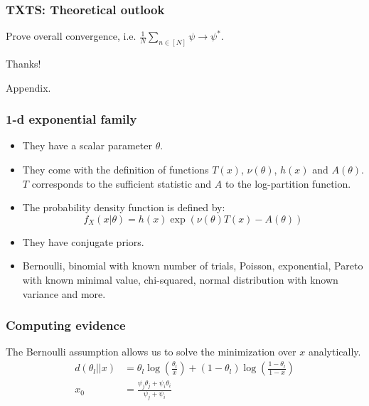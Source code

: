\documentclass[aspectratio=43]{beamer}
\begin{document}
\begin{frame}
\frametitle{TXTS: Theoretical outlook}
Prove overall convergence, i.e. $\frac{1}{N}\sum_{n \in [N]} \psi \rightarrow \psi^*$.
\end{frame}

\begin{frame}
Thanks!
\end{frame}

\appendix

\begin{frame}
Appendix.
\end{frame}

\begin{frame}
\frametitle{1-d exponential family}
\begin{itemize}
  \item They have a scalar parameter $\theta$.
  \item They come with the definition of functions $T(x)$, $\nu(\theta)$, $h(x)$ and $A(\theta)$. $T$ corresponds to the sufficient statistic and $A$ to the log-partition function.
  \item The probability density function is defined by:
    \[f_X(x|\theta) = h(x) \exp(\nu(\theta) T(x) - A(\theta))\]
  \item They have conjugate priors.
  \item Bernoulli, binomial with known number of trials, Poisson,
      exponential, Pareto with known minimal value, chi-squared, normal
      distribution with known variance and more.
\end{itemize}
\end{frame}

\begin{frame}
\frametitle{Computing evidence}
The Bernoulli assumption allows us to solve the minimization over $x$ analytically.
\begin{align}
  d(\theta_l||x) &= \theta_l \log(\frac{\theta_l}{x}) + (1-\theta_l) \log(\frac{1-\theta_l}{1-x}) \label{eq:bernoulli_kl} \\
  x_0 &= \frac{\psi_j\theta_j + \psi_i\theta_i}{\psi_j + \psi_i}
\end{align}
\end{frame}
\end{document}
